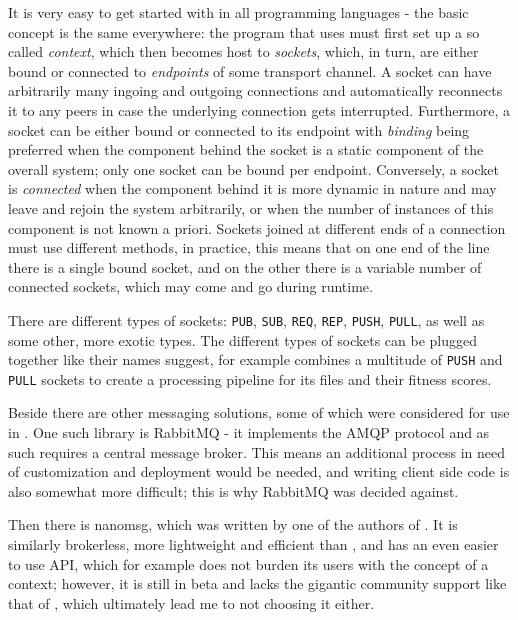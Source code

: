 It is very easy to get started with \zmq in all programming languages - the basic concept is the
same everywhere: the program that uses \zmq must first set up a so called \emph{context}, which then becomes
host to \emph{sockets}, which, in turn, are either bound or connected to \emph{endpoints} of some transport
channel. A socket can have arbitrarily many ingoing and outgoing connections and \zmq automatically reconnects
it to any peers in case the underlying connection gets interrupted. Furthermore, a socket can be either bound
or connected to its endpoint with \emph{binding} being preferred when the component behind the socket is a
static component of the overall system; only one socket can be bound per endpoint. Conversely, a socket is
\emph{connected} when the component behind it is more dynamic in nature and may leave and rejoin the system
arbitrarily, or when the number of instances of this component is not known a priori. Sockets joined at
different ends of a connection must use different methods, in practice, this means that on one end of the line
there is a single bound socket, and on the other there is a variable number of connected sockets, which may
come and go during runtime.

There are different types of sockets: \texttt{PUB}, \texttt{SUB}, \texttt{REQ}, \texttt{REP}, \texttt{PUSH}, 
\texttt{PULL}, as well as some other, more exotic types. The different types of sockets can be plugged together
like their names suggest, for example \xmlmate combines a multitude of \texttt{PUSH} and \texttt{PULL} sockets
to create a processing pipeline for its \xml files and their fitness scores.

Beside \zmq there are other messaging solutions, some of which were considered for use in \xmlmate. One such
library is {\small RabbitMQ}\cite{rabbitmq} - it implements the AMQP protocol and as such requires a central
message broker. This means an additional process in need of customization and deployment would be needed, and
writing client side code is also somewhat more difficult; this is why {\small RabbitMQ} was decided against.

Then there is {\small nanomsg}\cite{nanomsg}, which was written by one of the authors of \zmq. 
It is similarly brokerless, more lightweight and efficient than \zmq, and has an even easier to use API, which
for example does not burden its users with the concept of a context; however, it is still in beta and lacks
the gigantic community support like that of \zmq, which ultimately lead me to not choosing it either.
